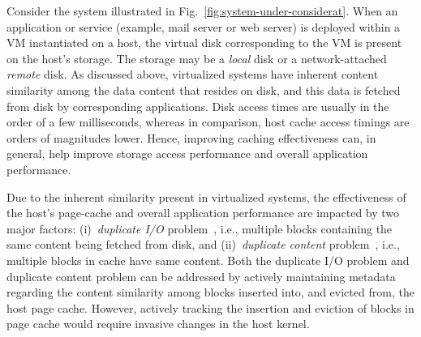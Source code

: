 Consider the system illustrated in Fig.~\ref{fig:system-under-considerat}.
When an application or service (example, mail server or web server) is deployed 
within a VM instantiated on a host,
the virtual disk 
corresponding to the VM is present on the host's storage.
The storage may be a \textit{local} disk or a network-attached
\textit{remote} disk.
As discussed above, virtualized systems have inherent content similarity
among the data content that resides on disk, and this data is fetched 
from disk by corresponding applications. 
Disk access times are usually in the order of a few 
milliseconds\cite{google, data-domain}, whereas in comparison, 
host cache access timings are orders of magnitudes lower\cite{pagecache, satori}. 
Hence, improving caching
effectiveness can, in general, help improve storage access performance
and overall application performance.




Due to the inherent similarity present in virtualized systems, the
effectiveness of the host's page-cache and overall application performance 
are impacted by two major factors:
(i)~\textit{duplicate I/O} problem~\cite{iodedup}, i.e.,
multiple blocks containing the same content being fetched from disk, and
(ii)~\textit{duplicate content} problem~\cite{satori,memorybuddies}, i.e.,
multiple blocks in cache have same content.
Both the duplicate I/O problem and duplicate content problem
can be addressed by actively maintaining metadata regarding the content 
similarity among blocks inserted into, and evicted from, the host page cache.
However, actively tracking the insertion and eviction of blocks in page cache
would require invasive changes in the host kernel. 


